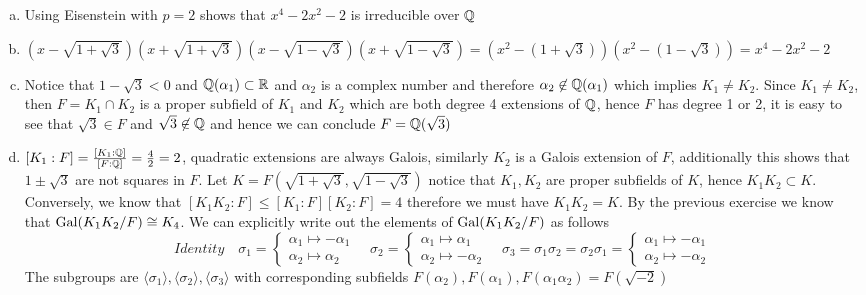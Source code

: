 \begin{solution}
    \begin{enumerate}[(a)]
        \item Using Eisenstein with $p = 2$ shows that $x^4 - 2x^2 - 2$ is irreducible over $\mathbb{Q}$

        \item $(x - \sqrt{1 + \sqrt{3}})(x + \sqrt{1 + \sqrt{3}})(x - \sqrt{1 -\sqrt{3}})(x + \sqrt{1 - \sqrt{3}}) = (x^2 - (1 + \sqrt{3}))(x^2 - (1 - \sqrt{3})) = x^4 -2x^2 -2$

        \item Notice that $1 - \sqrt{3} < 0$ and $\mathbb{Q}(\alpha_1) \subset \mathbb{R}$ and $\alpha_2$ is a complex number and therefore $\alpha_2 \not\in \mathbb{Q}(\alpha_1)$ which implies $K_1 \neq K_2$. Since $K_{1}\neq K_{2}$, then $F = K_1 \cap K_2$ is a proper subfield of $K_1$ and $K_2$ which are both degree 4 extensions of $\mathbb{Q}$, hence $F$ has degree 1 or 2, it is easy to see that $\sqrt{3} \in F$ and $\sqrt{3} \not\in \mathbb{Q}$ and hence we can conclude $F = \mathbb{Q}(\sqrt{3})$

        \item $[K_1:F] = \frac{[K_1:\mathbb{Q}]}{[F:\mathbb{Q}]} = \frac{4}{2} = 2$, quadratic extensions are always Galois, similarly $K_2$ is a Galois extension of $F$, additionally this shows that $1 \pm \sqrt{3}$ are not squares in $F$. Let $K = F(\sqrt{1 + \sqrt{3}}, \sqrt{1 - \sqrt{3}})$ notice that $K_1, K_2$ are proper subfields of $K$, hence $K_1K_2 \subset K$. Conversely, we know that $[K_1K_2:F] \leq [K_1:F][K_2:F] = 4$ therefore we must have $K_1K_2 = K$. By the previous exercise we know that $\operatorname{Gal}(K_1K_2/F) \cong K_4$. We can explicitly write out the elements of $\operatorname{Gal}(K_1K_2/F)$ as follows
        \[Identity \quad \sigma_1 = \begin{cases}
            \alpha_1 \mapsto -\alpha_1 \\
            \alpha_2 \mapsto \alpha_2
        \end{cases} \quad \sigma_2 = \begin{cases}
            \alpha_1 \mapsto \alpha_1 \\
            \alpha_2 \mapsto -\alpha_2
        \end{cases} \quad \sigma_3 = \sigma_1\sigma_2 = \sigma_2\sigma_1 = \begin{cases}
            \alpha_1 \mapsto -\alpha_1 \\
            \alpha_2 \mapsto -\alpha_2
        \end{cases}\]
        The subgroups are $\langle \sigma_1 \rangle, \langle \sigma_2 \rangle, \langle \sigma_3 \rangle$ with corresponding subfields $F(\alpha_2), F(\alpha_1), F(\alpha_1\alpha_2) = F(\sqrt{-2})$
    

\end{enumerate}
\end{solution}
